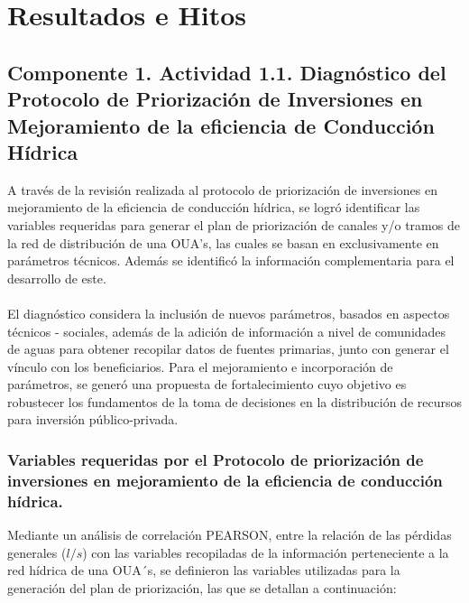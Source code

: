\documentclass[]{article}
\begin{document}
\section{Resultados e Hitos}

\subsection{Componente 1. Actividad 1.1. Diagnóstico del Protocolo de Priorización de Inversiones en Mejoramiento de la eficiencia de Conducción Hídrica}

A través de la revisión realizada al protocolo de priorización de inversiones en mejoramiento de la eficiencia de conducción hídrica, se logró identificar las variables requeridas para generar el plan de priorización de canales y/o tramos de la red de distribución de una OUA's, las cuales se basan en exclusivamente en parámetros técnicos. Además se identificó la información complementaria para el desarrollo de este.\\
\\
El diagnóstico considera la inclusión de nuevos parámetros, basados en aspectos técnicos - sociales, además de la adición de información a nivel de comunidades de aguas para obtener recopilar datos de fuentes primarias, junto con generar el vínculo con los beneficiarios. Para el mejoramiento e incorporación de parámetros, se generó una propuesta de fortalecimiento cuyo objetivo es robustecer los fundamentos de la toma de decisiones en la distribución de recursos para inversión público-privada.

\subsubsection{Variables requeridas por el Protocolo de priorización de inversiones en mejoramiento de la eficiencia de conducción hídrica.}

Mediante un análisis de correlación PEARSON, entre la relación de las pérdidas generales ($l/s$) con las variables recopiladas de la información perteneciente a la red hídrica de una OUA´s, se definieron las variables utilizadas para la generación del plan de priorización, las que se detallan a continuación:
\end{document}
